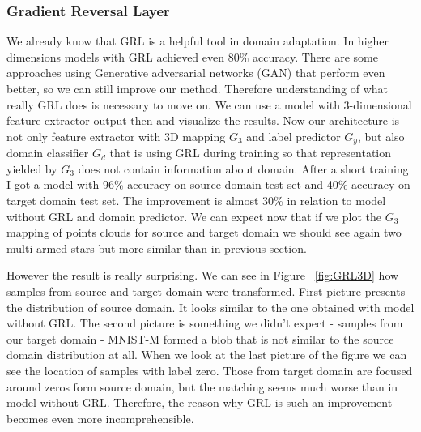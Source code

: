 \documentclass{article}
\begin{document}
\subsubsection{Gradient Reversal Layer}
\par
We already know that GRL is a helpful tool in domain adaptation. In higher dimensions models with GRL achieved even 80\% accuracy. There are some approaches using Generative adversarial networks (GAN) that perform even better, so we can still improve our method. Therefore understanding of what really  GRL does is necessary to move on. We can use a model with 3-dimensional feature extractor output then and visualize the results. Now our architecture is not only feature extractor with 3D mapping $G_{3}$ and label predictor $G_{y}$, but also domain classifier $G_{d}$ that is using GRL during training so that representation yielded by $G_{3}$ does not contain information about domain. After a short training I got a model with 96\% accuracy on source domain test set and 40\% accuracy on target domain test set. The improvement is almost 30\% in relation to model without GRL and domain predictor. We can expect now that if we plot the $G_{3}$ mapping of points clouds for source and target domain we should see again two multi-armed stars but more similar than in previous section. 
\par
However the result is really surprising. We can see in Figure ~\ref{fig:GRL3D} how samples from source and target domain were transformed. First picture presents the distribution of source domain. It looks similar to the one obtained with model without GRL. The second picture is something we didn't expect - samples from our target domain - MNIST-M formed a blob that is not similar to the source domain distribution at all. When we look at the last picture of the figure we can see the location of samples with label zero. Those from target domain are focused around zeros form source domain, but the matching seems much worse than in model without GRL. Therefore, the reason why GRL is such an improvement becomes even more incomprehensible.
\end{document}
